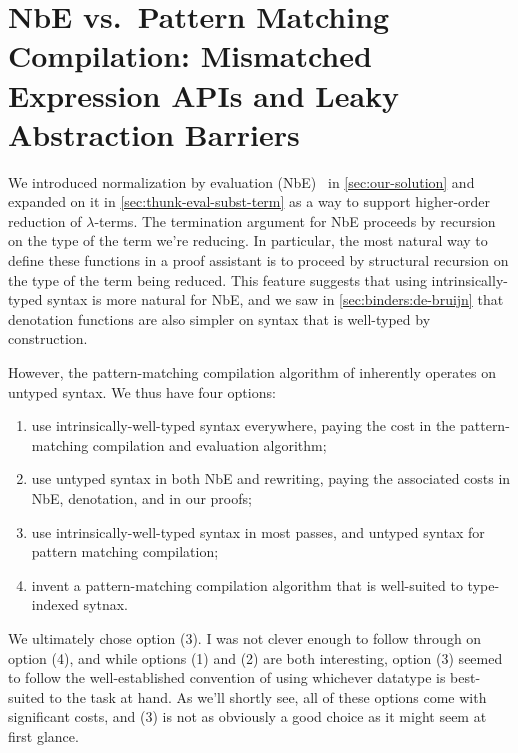 \section{NbE vs.~Pattern Matching Compilation: Mismatched Expression APIs and Leaky Abstraction Barriers}\label{sec:rewriting-more:AST:choices}
We introduced normalization by evaluation (NbE)~\cite{NbE} in \autoref{sec:our-solution} and expanded on it in \autoref{sec:thunk-eval-subst-term} as a way to support higher-order reduction of $\lambda$-terms.
The termination argument for NbE proceeds by recursion on the type of the term we're reducing.
In particular, the most natural way to define these functions in a proof assistant is to proceed by structural recursion on the type of the term being reduced.
This feature suggests that using intrinsically-typed syntax is more natural for NbE, and we saw in \autoref{sec:binders:de-bruijn} that denotation functions are also simpler on syntax that is well-typed by construction.

However, the pattern-matching compilation algorithm of \textcite{maranget2008compiling} inherently operates on untyped syntax.
We thus have four options:
\begin{enumerate}[(1)]
\item
  use intrinsically-well-typed syntax everywhere, paying the cost in the pattern-matching compilation and evaluation algorithm;
\item
  use untyped syntax in both NbE and rewriting, paying the associated costs in NbE, denotation, and in our proofs;
\item
  use intrinsically-well-typed syntax in most passes, and untyped syntax for pattern matching compilation;
\item
  invent a pattern-matching compilation algorithm that is well-suited to type-indexed sytnax.
\end{enumerate}
We ultimately chose option (3).
I was not clever enough to follow through on option (4), and while options (1) and (2) are both interesting, option (3) seemed to follow the well-established convention of using whichever datatype is best-suited to the task at hand.
As we'll shortly see, all of these options come with significant costs, and (3) is not as obviously a good choice as it might seem at first glance.

